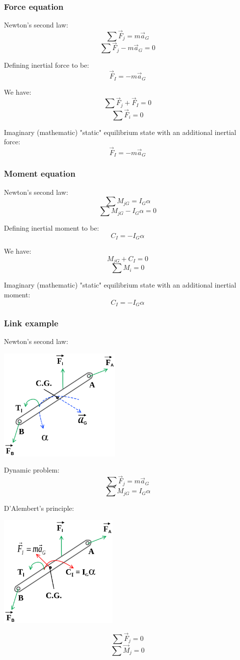 \documentclass[11pt]{article}
\begin{document}
\subsubsection{Force equation}
\label{sec:org7f9e772}
Newton's second law:
\[\sum \vec{F}_j = m \vec{a}_G\]
\[\sum \vec{F}_j - m \vec{a}_G = 0\]

Defining inertial force to be:
\[\vec{F}_I = - m \vec{a}_G\]

We have:
\[\sum \vec{F}_j + \vec{F}_I = 0\]
\[\sum \vec{F}_i = 0\]

Imaginary (mathematic) "static" equilibrium state with an additional inertial force:
\[\vec{F}_I = - m \vec{a}_G\]
\subsubsection{Moment equation}
\label{sec:org9847cab}
Newton's second law:
\[\sum M_{jG} = I_G \alpha\]
\[\sum M_{jG} - I_G \alpha = 0\]

Defining inertial moment to be:
\[C_I = - I_G \alpha\]

We have:
\[M_{jG} + C_I = 0\]
\[\sum M_i = 0\]

Imaginary (mathematic) "static" equilibrium state with an additional inertial moment:
\[C_I = - I_G \alpha\]
\subsubsection{Link example}
\label{sec:org4bdef8d}
Newton's second law:
\begin{center}
\includegraphics[height=15em]{./images/newtons-law-link-example-diagram.png}
\end{center}

Dynamic problem:
\[\sum \vec{F}_j = m \vec{a}_G\]
\[\sum M_{jG} = I_G \alpha\]

D'Alembert's principle:
\begin{center}
\includegraphics[height=15em]{./images/d-alemberts-principle-link-example-diagram.png}
\end{center}
\[\sum \vec{F}_j = 0\]
\[\sum \vec{M}_j = 0\]
\end{document}
